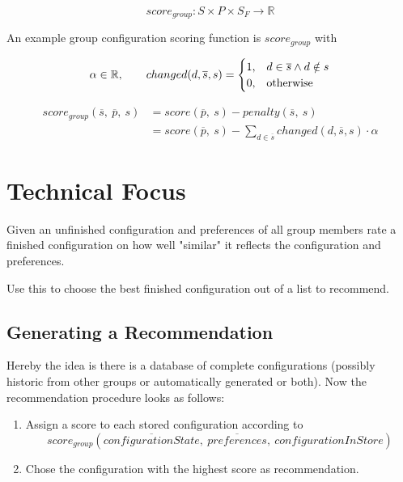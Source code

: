 \documentclass{article}
\begin{document}
\begin{equation}
    score_{group}: S \times P \times S_F \to \mathbb{R}
\end{equation}

An example group configuration scoring function is $score_{group}$ with

\begin{equation}
    \notag \alpha \in \mathbb{R}, \qquad     changed(d,\overline{s}, s) = 
    \begin{cases}
      1, & d \in \overline{s} \land d \notin s \\
      0, & \text{otherwise}
    \end{cases}
\end{equation}

\begin{equation}
    \begin{split}
        score_{group}(\overline{s},\ \overline{p},\ s)
        & = score(\overline{p},\ s) - penalty(\overline{s},\ s) \\
        & = score(\overline{p},\ s) - \sum_{d \in \overline{s}} changed(d,\overline{s}, s) \cdot \alpha
    \end{split}
\end{equation}


\section{Technical Focus}

Given an unfinished configuration and preferences of all group members rate a finished configuration on how well "similar" it reflects the configuration and preferences.

Use this to choose the best finished configuration out of a list to recommend.

\subsection{Generating a Recommendation}

Hereby the idea is there is a database of complete configurations (possibly historic from other groups or automatically generated or both).
Now the recommendation procedure looks as follows:

\begin{enumerate}
    \item Assign a score to each stored configuration according to $$score_{group}(\overline{configurationState},\ \overline{preferences}, \ configurationInStore)$$
    \item Chose the configuration with the highest score as recommendation.
\end{enumerate}
\end{document}
